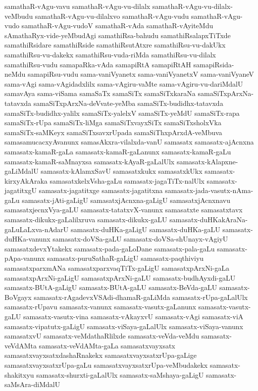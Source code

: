 {samathaR-vAgu-vavu
samathaR-vAgu-vu-dilalx
samathaR-vAgu-vu-dilalx-veMbudu
samathaR-vAgu-vu-dilalxvo
samathaR-vAgu-vudu
samathaR-vAgu-vudo
samathaR-vAgu-vudoV
samathaR-vAda
samathaR-vAyiteMdu
sAmathaRyx-vide-yeMbudAgi
samathiRsa-bahudu
samathiRsalapxTiTxde
samathiRsidare
samathiRside
samathiRsutAtxre
samathiRsu-vu-dakUkx
samathiRsu-vu-dakekx
samathiRsu-vuda-riMda
samathiRsu-vu-dilalx
samathiRsu-vudu
samapaRka-vAda
samapiRtA
samapiRtAH
samapiRsida-neMdu
samapiRsu-vudu
sama-vaniVyanetx
sama-vaniVyanetxV
sama-vaniVyaneV
sama-vAgi
sama-vAgidadxlilx
sama-vAgiru-vaMte
sama-vAgiru-vu-dariMdalU
samavAya
sama-viSama
samaSaTx
samaSiTx
samaSiTxkaraNa
samaSiTxpArxNa-tatavxda
samaSiTxpArxNa-deVvate-yeMba
samaSiTx-budidhx-tatavxda
samaSiTx-budidhx-yalilx
samaSiTx-yalelxV
samaSiTx-yeMdU
samaSiTx-rapa
samaSiTx-rUpa
samaSiTx-liMga
samaSiTxvayxSiTx
samaSiTxsholxVka
samaSiTx-saMKeyx
samaSiTxsavxrUpada
samaSiThxpArxdA-veMbuva
samasamucacxyAvanunx
samasAkxra-vilalxda-vanU
samasatx
samasatx-ajAcnxna
samasatx-kamaR-gaLa
samasatx-kamaR-gaLanunx
samasatx-kamaR-gaLu
samasatx-kamaR-saMnayxsa
samasatx-kAyaR-gaLalUlx
samasatx-kAlapxne-gaLiMdalU
samasatx-kAlamxSavU
samasatxkukx
samasatxkUkx
samasatx-kirxyAkAraka
samasatxkelxVsha-gaLu
samasatx-jagaTiTx-nalUlx
samasatx-jagatitxgU
samasatx-jagatitxge
samasatx-jagatitxna
samasatx-jada-vasutx-nAma-gaLu
samasatx-jAti-gaLigU
samasatxjAcnxna-gaLigU
samasatxjAcnxnavu
samasatxjecnxVya-gaLU
samasatx-tatatxvX-vanunx
samasatxte
samasatxtavx
samasatx-dikukx-gaLalilxruva
samasatx-dikukx-gaLU
samasatx-duHKakAraNa-gaLuLaLxva-nAdarU
samasatx-duHKa-gaLigU
samasatx-duHKa-gaLU
samasatx-duHKa-vanunx
samasatx-doVSa-gaLU
samasatx-doVSa-shUnayx-vAgiyU
samasatxdevxYtakekx
samasatx-pada-gaLoDane
samasatx-pala-gaLu
samasatx-pApa-vanunx
samasatx-puruSathaR-gaLigU
samasatx-paqthiviyu
samasatxparxmANa
samasatxparxvaqTiTx-gaLigU
samasatxpArxNi-gaLa
samasatxpArxNi-gaLigU
samasatxpArxNi-gaLU
samasatx-budhAyxdi-gaLU
samasatx-BUtA-gaLigU
samasatx-BUtA-gaLU
samasatx-BeVda-gaLU
samasatx-BoVgayx
samasatx-rAgadevxVSAdi-dhamaR-gaLiMda
samasatx-rUpa-gaLalUlx
samasatx-rUpavu
samasatx-vanunx
samasatx-vasutx-gaLanunx
samasatx-vasutx-gaLU
samasatx-vasutx-vina
samasatx-vAkayxvU
samasatx-vAgi
samasatx-viA
samasatx-vipatutx-gaLigU
samasatx-viSaya-gaLalUlx
samasatx-viSaya-vanunx
samasatxvU
samasatx-veMdathaRlilxde
samasatx-veVda-veMdu
samasatx-veVdAMta
samasatx-veVdAMta-gaLa
samasatxvayxsatx
samasatxvayxsatxdashaRnakekx
samasatxvayxsatxrUpa-gaLige
samasatxvayxsatxrUpa-gaLu
samasatxvayxsatxrUpa-veMbudakekx
samasatx-shakitxyu
samasatx-shurxti-gaLalUlx
samasatx-saMshaya-gaLigU
samasatx-saMsAra-diMdalU
}

